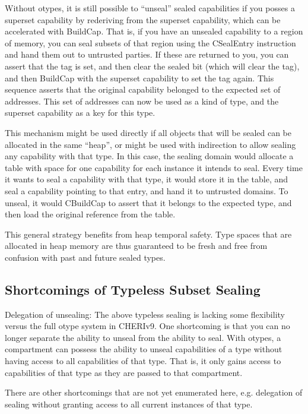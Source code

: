 Without otypes, it is still possible to ``unseal'' sealed capabilities if you posses a superset capability by rederiving from the superset capability, which can be accelerated with BuildCap.
That is, if you have an unsealed capability to a region of memory, you can seal subsets of that region using the CSealEntry instruction and hand them out to untrusted parties.
If these are returned to you, you can assert that the tag is set, and then clear the sealed bit (which will clear the tag), and then BuildCap with the superset capability to set the tag again.
This sequence asserts that the original capability belonged to the expected set of addresses.
This set of addresses can now be used as a kind of type, and the superset capability as a key for this type.

This mechanism might be used directly if all objects that will be sealed can be allocated in the same ``heap'', or might be used with indirection to allow sealing any capability with that type.
In this case, the sealing domain would allocate a table with space for one capability for each instance it intends to seal.
Every time it wants to seal a capability with that type, it would store it in the table, and seal a capability pointing to that entry, and hand it to untrusted domains.
To unseal, it would CBuildCap to assert that it belongs to the expected type, and then load the original reference from the table.

This general strategy benefits from heap temporal safety.
Type spaces that are allocated in heap memory are thus guaranteed to be fresh and free from confusion with past and future sealed types.

\subsection{Shortcomings of Typeless Subset Sealing}

Delegation of unsealing: The above typeless sealing is lacking some flexibility versus the full otype system in CHERIv9.
One shortcoming is that you can no longer separate the ability to unseal from the ability to seal.
With otypes, a compartment can possess the ability to unseal capabilities of a type without having access to all capabilities of that type.
That is, it only gains access to capabilities of that type as they are passed to that compartment.

There are other shortcomings that are not yet enumerated here, e.g. delegation of sealing without granting access to all current instances of that type.

